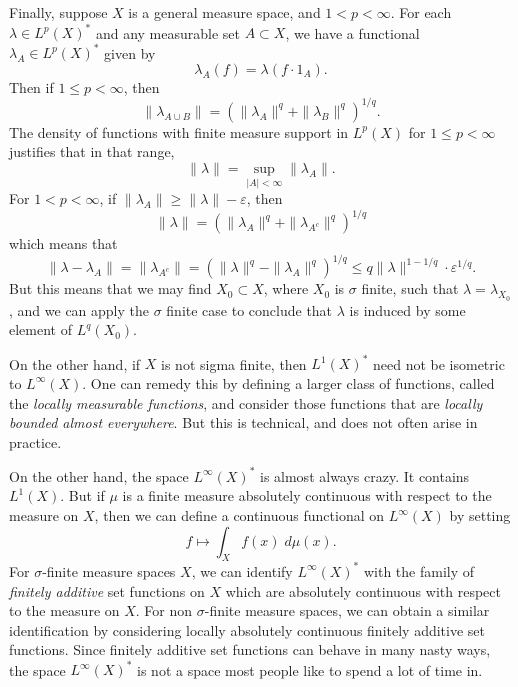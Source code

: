 \begin{example}
    Finally, suppose $X$ is a general measure space, and $1 < p < \infty$. For each $\lambda \in L^p(X)^*$ and any measurable set $A \subset X$, we have a functional $\lambda_A \in L^p(X)^*$ given by
    \[ \lambda_A(f) = \lambda(f \cdot 1_A). \]
    Then if $1 \leq p < \infty$, then
    \[ \| \lambda_{A \cup B} \| = \left( \| \lambda_A \|^q + \| \lambda_B \|^q \right)^{1/q}. \]
    The density of functions with finite measure support in $L^p(X)$ for $1 \leq p < \infty$ justifies that in that range,
    \[ \| \lambda \| = \sup_{|A| < \infty} \| \lambda_A \|. \]
    For $1 < p < \infty$, if $\| \lambda_A \| \geq \| \lambda \| - \varepsilon$, then
    \[ \| \lambda \| = \left( \| \lambda_A \|^q + \| \lambda_{A^c} \|^q \right)^{1/q} \]
    which means that
    \[ \| \lambda - \lambda_A \| = \| \lambda_{A^c} \| = \left( \| \lambda \|^q - \| \lambda_A \|^q \right)^{1/q} \leq q \| \lambda \|^{1-1/q} \cdot \varepsilon^{1/q}. \]
    But this means that we may find $X_0 \subset X$, where $X_0$ is $\sigma$ finite, such that $\lambda = \lambda_{X_0}$, and we can apply the $\sigma$ finite case to conclude that $\lambda$ is induced by some element of $L^q(X_0)$.

    On the other hand, if $X$ is not sigma finite, then $L^1(X)^*$ need not be isometric to $L^\infty(X)$. One can remedy this by defining a larger class of functions, called the \emph{locally measurable functions}, and consider those functions that are \emph{locally bounded almost everywhere}. But this is technical, and does not often arise in practice.

    On the other hand, the space $L^\infty(X)^*$ is almost always crazy. It contains $L^1(X)$. But if $\mu$ is a finite measure absolutely continuous with respect to the measure on $X$, then we can define a continuous functional on $L^\infty(X)$ by setting
    \[ f \mapsto \int_X f(x)\; d\mu(x). \]
    For $\sigma$-finite measure spaces $X$, we can identify $L^\infty(X)^*$ with the family of \emph{finitely additive} set functions on $X$ which are absolutely continuous with respect to the measure on $X$. For non $\sigma$-finite measure spaces, we can obtain a similar identification by considering locally absolutely continuous finitely additive set functions. Since finitely additive set functions can behave in many nasty ways, the space $L^\infty(X)^*$ is not a space most people like to spend a lot of time in.
\end{example}

